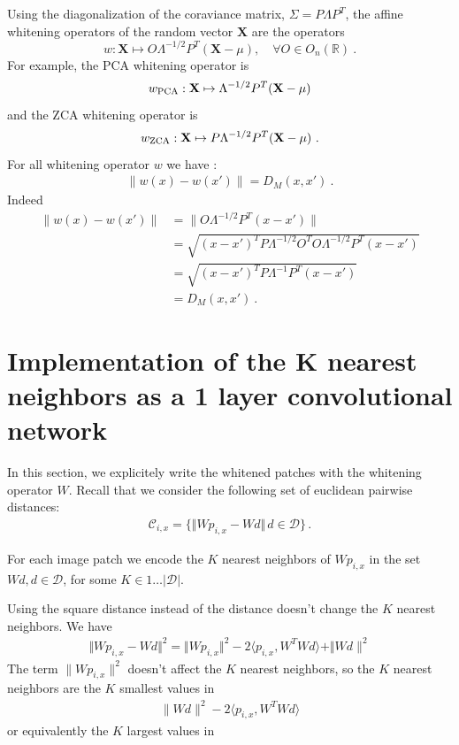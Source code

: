 \documentclass{article}
\begin{document}
Using the diagonalization of the coraviance matrix,  $\Sigma = P\Lambda P^T$, the affine whitening operators of the random vector $\mathbf{X}$ are the operators 
\begin{equation}
\label{whitening}
     w : \mathbf{X} \mapsto O \Lambda^{-1/2} P^T (\mathbf{X} - \mu), \quad \forall O \in  O_n (\mathbb{R}) \ .
\end{equation}
For example, the PCA whitening operator is 
\begin{equation*}
     w_{\rm PCA} : \mathbf{X} \mapsto \Lambda^{-1/2} P^T (\mathbf{X} - \mu)
\end{equation*}
and the ZCA whitening operator is 
\begin{equation*}
     w_{\rm ZCA} : \mathbf{X} \mapsto P \Lambda^{-1/2} P^T (\mathbf{X} - \mu) \ .
\end{equation*}
For all whitening operator $w$ we have :
\begin{align*}
\|w(x) - w(x')\| = D_M(x, x') \ .
\end{align*}
Indeed 
\begin{align*}
  \|w(x) - w(x')\|
    &= \| O \Lambda^{-1/2} P^T ( x - x') \|\\
    &= \sqrt{(x - x')^T P \Lambda^{-1/2} O^T O \Lambda^{-1/2} P^T (x - x') }\\
    &=  \sqrt{ (x - x')^T P \Lambda^{-1} P^T (x - x')} \\
    &= D_M(x, x') \ .
\end{align*}

\section{Implementation of the K nearest neighbors as a 1 layer convolutional network}

In this section, we explicitely write the whitened patches with the whitening operator $W$.
Recall that  we consider the following set of euclidean pairwise distances:
\begin{align*}\mathcal{C}_{i, x} =\{\Vert W p_{i, x} - W d \Vert\, d\in\mathcal{D} \}\,.\end{align*}

For each image patch we encode the $K$ nearest neighbors of $W p_{i,x}$ in the set $Wd, d \in \mathcal{D}$, for some $ K \in 1 \ldots|\mathcal{D}| $.

Using the square distance instead of the distance doesn't change the $K$ nearest neighbors.
We have 
\begin{align*} \Vert Wp_{i,x} - Wd \Vert^2 = \Vert Wp_{i,x} \Vert^2 - 2 \langle p_{i,x}, W^T W d \rangle + \Vert Wd\|^2 \end{align*}
The term $\|Wp_{i,x}\|^2$ doesn't affect the $K$ nearest neighbors, so the $K$ nearest neighbors are the $K$ smallest values in
\begin{align*}
        \|Wd \|^2 - 2\langle p_{i,x}, W^T W d \rangle
\end{align*}
or equivalently the  $K$ largest values in
\end{document}
